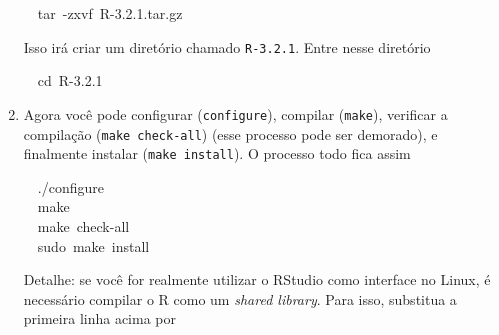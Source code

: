 \documentclass[a4paper,12pt]{article}\usepackage[]{graphicx}\usepackage[]{color}
\makeatletter
\newcommand{\hlnum}[1]{\textcolor[rgb]{0.686,0.059,0.569}{#1}}%
\newcommand{\hlopt}[1]{\textcolor[rgb]{0,0,0}{#1}}%
\newcommand{\hlstd}[1]{\textcolor[rgb]{0.345,0.345,0.345}{#1}}%
\newcommand{\hlkwb}[1]{\textcolor[rgb]{0.69,0.353,0.396}{#1}}%
\newcommand{\hlkwc}[1]{\textcolor[rgb]{0.333,0.667,0.333}{#1}}%
\newenvironment{kframe}{%
 \def\at@end@of@kframe{}%
 \ifinner\ifhmode%
  \def\at@end@of@kframe{\end{minipage}}%
  \begin{minipage}{\columnwidth}%
 \fi\fi%
 \def\FrameCommand##1{\hskip\@totalleftmargin \hskip-\fboxsep
 \colorbox{shadecolor}{##1}\hskip-\fboxsep
     \hskip-\linewidth \hskip-\@totalleftmargin \hskip\columnwidth}%
 \MakeFramed {\advance\hsize-\width
   \@totalleftmargin\z@ \linewidth\hsize
   \@setminipage}}%
 {\par\unskip\endMakeFramed%
 \at@end@of@kframe}
\newenvironment{knitrout}{}{} %
\providecommand{\R}{\textsf{R}\xspace}
\providecommand{\RStudio}{\textsf{RStudio}\xspace}
\makeatother
\begin{document}
\begin{enumerate}
\begin{knitrout}\small
{}\color{fgcolor}\begin{kframe}
\noindent
\ttfamily
\hlstd{}\hlstd{\ \ }\hlstd{}\hlkwc{tar\ }\hlstd{}\hlopt{{-}}\hlstd{zxvf\ R{-}3.2}\hlnum{.1}\hlstd{.}\hlkwc{tar}\hlstd{.gz}\hspace*{\fill}
\mbox{}
\normalfont
\normalsize
\end{kframe}
\end{knitrout}
  Isso irá criar um diretório chamado \texttt{R-3.2.1}. Entre nesse
  diretório
\begin{knitrout}\small
{}\color{fgcolor}\begin{kframe}
\noindent
\ttfamily
\hlstd{}\hlstd{\ \ }\hlstd{}\hlkwb{cd\ }\hlstd{R{-}3.2}\hlnum{.1}\hlstd{}\hspace*{\fill}
\mbox{}
\normalfont
\normalsize
\end{kframe}
\end{knitrout}
\item Agora você pode configurar (\texttt{configure}), compilar
  (\texttt{make}), verificar a compilação (\texttt{make check-all})
  (esse processo pode ser demorado), e finalmente instalar (\texttt{make
  install}). O processo todo fica assim
\begin{knitrout}\small
{}\color{fgcolor}\begin{kframe}
\noindent
\ttfamily
\hlstd{}\hlstd{\ \ }\hlstd{.}\hlopt{/}\hlstd{configure\hspace*{\fill}\\
}\hlstd{\ \ }\hlstd{}\hlkwc{make}\hspace*{\fill}\\
\hlstd{}\hlstd{\ \ }\hlstd{}\hlkwc{make\ }\hlstd{check{-}all\hspace*{\fill}\\
}\hlstd{\ \ }\hlstd{sudo\ }\hlkwc{make\ install}\hlstd{}\hspace*{\fill}
\mbox{}
\normalfont
\normalsize
\end{kframe}
\end{knitrout}
  Detalhe: se você for realmente utilizar o \RStudio como interface no
  Linux, é necessário compilar o \R como um \textit{shared
    library}. Para isso, substitua a primeira linha acima por
\begin{knitrout}\small
{}\color{fgcolor}\begin{kframe}

\end{kframe}
\end{knitrout}
\end{enumerate}
\end{document}

